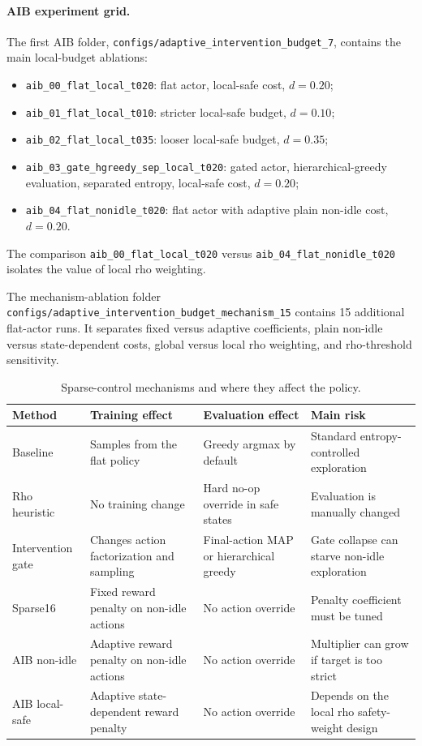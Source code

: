 \paragraph{AIB experiment grid.}
The first AIB folder, \texttt{configs/adaptive\_intervention\_budget\_7},
contains the main local-budget ablations:
\begin{itemize}
  \item \texttt{aib\_00\_flat\_local\_t020}: flat actor, local-safe cost,
  \(d=0.20\);
  \item \texttt{aib\_01\_flat\_local\_t010}: stricter local-safe budget,
  \(d=0.10\);
  \item \texttt{aib\_02\_flat\_local\_t035}: looser local-safe budget,
  \(d=0.35\);
  \item \texttt{aib\_03\_gate\_hgreedy\_sep\_local\_t020}: gated actor,
  hierarchical-greedy evaluation, separated entropy, local-safe cost,
  \(d=0.20\);
  \item \texttt{aib\_04\_flat\_nonidle\_t020}: flat actor with adaptive plain
  non-idle cost, \(d=0.20\).
\end{itemize}
The comparison \texttt{aib\_00\_flat\_local\_t020} versus
\texttt{aib\_04\_flat\_nonidle\_t020} isolates the value of local rho weighting.

The mechanism-ablation folder
\texttt{configs/adaptive\_intervention\_budget\_mechanism\_15} contains 15
additional flat-actor runs. It separates fixed versus adaptive coefficients,
plain non-idle versus state-dependent costs, global versus local rho weighting,
and rho-threshold sensitivity.

\begin{table}[htbp]
  \centering
  \small
  \caption{Sparse-control mechanisms and where they affect the policy.}
  \label{tab:sparse-control-mechanisms}
  \setlength{\tabcolsep}{3pt}
  \begin{tabular}{L{0.18\textwidth}L{0.30\textwidth}L{0.24\textwidth}L{0.18\textwidth}}
    \toprule
    Method & Training effect & Evaluation effect & Main risk \\
    \midrule
    Baseline & Samples from the flat policy & Greedy argmax by default &
    Standard entropy-controlled exploration \\
    Rho heuristic & No training change & Hard no-op override in safe states &
    Evaluation is manually changed \\
    Intervention gate & Changes action factorization and sampling &
    Final-action MAP or hierarchical greedy & Gate collapse can starve non-idle exploration \\
    Sparse16 & Fixed reward penalty on non-idle actions & No action override &
    Penalty coefficient must be tuned \\
    AIB non-idle & Adaptive reward penalty on non-idle actions & No action override &
    Multiplier can grow if target is too strict \\
    AIB local-safe & Adaptive state-dependent reward penalty & No action override &
    Depends on the local rho safety-weight design \\
    \bottomrule
  \end{tabular}
\end{table}

